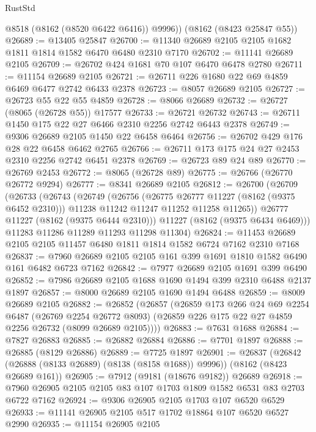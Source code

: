 \begin{lexlean}{RustStd}
\begin{coremodule}
        @8518
        (@8162 (@8520 @6422 @6416))
        @9996))
    (@8162 (@8423 @25847 @55))
@26689 := @13405 @25847
@26700 := @11340 @26689 @2105 @2105 @1682 @1811 @1814 @1582 @6470 @6480 @2310 @7170
@26702 := @11141 @26689 @2105
@26709 := @26702 @424 @1681 @70 @107 @6470 @6478 @2780
@26711 := @11154 @26689 @2105
@26721 := @26711 @226 @1680 @22 @69 @4859 @6469 @6477 @2742 @6433 @2378
@26723 := @8057 @26689 @2105
@26727 := @26723 @55 @22 @55 @4859
@26728 := @8066 @26689
@26732 := @26727 (@8065 (@26728 @55)) @17577
@26733 := @26721 @26732
@26743 := @26711 @1450 @175 @22 @27 @6466 @2310 @2256 @2742 @6443 @2378
@26749 := @9306 @26689 @2105 @1450 @22 @6458 @6464
@26756 := @26702 @429 @176 @28 @22 @6458 @6462 @2765
@26766 := @26711 @173 @175 @24 @27 @2453 @2310 @2256 @2742 @6451 @2378
@26769 := @26723 @89 @24 @89
@26770 := @26769 @2453
@26772 := @8065 (@26728 @89)
@26775 := @26766 (@26770 @26772 @9294)
@26777 := @8341 @26689 @2105
@26812 := @26700
    (@26709
      (@26733
        (@26743
          (@26749
            (@26756
              (@26775 @26777 @11227 (@8162 (@9375 @6452 @2310)))
              @11238
              @11242
              @11247
              @11252
              @11258
              @11265))
          @26777
          @11227
          (@8162 (@9375 @6444 @2310)))
        @11227
        (@8162 (@9375 @6434 @6469)))
      @11283
      @11286
      @11289
      @11293
      @11298
      @11304)
@26824 := @11453 @26689 @2105 @2105 @11457 @6480 @1811 @1814 @1582 @6724 @7162 @2310 @7168
@26837 := @7960 @26689 @2105 @2105 @161 @399 @1691 @1810 @1582 @6490 @161 @6482 @6723 @7162
@26842 := @7977 @26689 @2105 @1691 @399 @6490
@26852 := @7986 @26689 @2105 @1688 @1690 @1494 @399 @2310 @6488 @2137 @1897
@26857 := @8000 @26689 @2105 @1690 @1494 @6488
@26859 := @8009 @26689 @2105
@26882 := @26852
    (@26857
      (@26859
        @173
        @266
        @24
        @69
        @2254
        @6487
        (@26769 @2254 @26772 @8093)
        (@26859 @226 @175 @22 @27 @4859 @2256 @26732 (@8099 @26689 @2105))))
@26883 := @7631 @1688
@26884 := @7827 @26883
@26885 := @26882 @26884
@26886 := @7701 @1897
@26888 := @26885 (@8129 @26886)
@26889 := @7725 @1897
@26901 := @26837
    (@26842 (@26888 (@8133 @26889) (@8138 (@8158 @1688)) @9996))
    (@8162 (@8423 @26689 @161))
@26905 := @7912 (@9181 (@18676 @9182)) @26689
@26918 := @7960 @26905 @2105 @2105 @83 @107 @1703 @1809 @1582 @6531 @83 @2703 @6722 @7162
@26924 := @9306 @26905 @2105 @1703 @107 @6520 @6529
@26933 := @11141 @26905 @2105 @517 @1702 @18864 @107 @6520 @6527 @2990
@26935 := @11154 @26905 @2105

\end{coremodule}
\end{lexlean}
